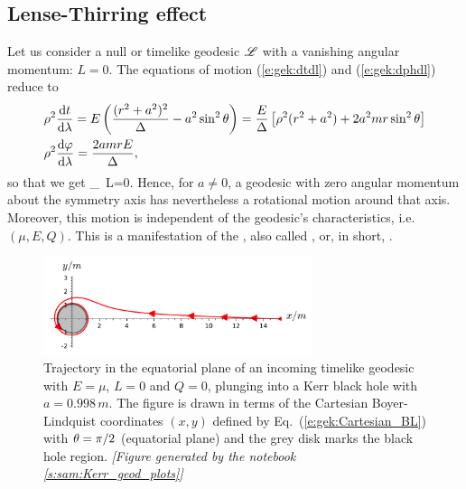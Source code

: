 \subsection{Lense-Thirring effect} \label{s:gek:Lense-Thirring}

Let us consider a null or timelike geodesic $\mathscr{L}$ with a vanishing angular
momentum: $L=0$. The equations of motion (\ref{e:gek:dtdl}) and (\ref{e:gek:dphdl})
reduce to
\begin{align}
& \rho^2 \frac{\mathrm{d} t}{\mathrm{d} \lambda} = E \left( \frac{(r^2 + a^2)^2}{\Delta}   - a^2 \sin^2\theta \right)
= \frac{E}{\Delta} \left[ \rho^2(r^2 + a^2) + 2 a^2 m r \sin^2\theta \right] \nonumber \\
& \rho^2 \frac{\mathrm{d} \varphi}{\mathrm{d} \lambda}  = \frac{2 a m r E}{\Delta} , \nonumber
\end{align}
so that we get
\be \label{e:gek:dphdt_frame_dragging}
     _{\ L=0}.
\ee
Hence, for $a\neq 0$, a geodesic with zero angular momentum about the
symmetry axis has nevertheless a rotational motion around that axis.
Moreover, this motion is independent of the geodesic's characteristics, i.e. $(\mu,E,Q)$.
This is a manifestation of the ,
also called , or, in short, .

\begin{figure}
\centerline{\includegraphics[width=0.7\textwidth]{gek_frame_dragging.pdf}}
\caption[]{\label{f:gek:frame_dragging} \footnotesize
Trajectory in the equatorial plane of an incoming timelike geodesic with
$E = \mu$, $L=0$ and $Q=0$, plunging into a Kerr black hole with $a = 0.998 \, m$.
The figure is drawn in terms
of the Cartesian Boyer-Lindquist coordinates $(x,y)$ defined by
Eq.~(\ref{e:gek:Cartesian_BL}) with $\theta=\pi/2$ (equatorial plane)
and the grey disk marks the black hole region.
\textsl{[Figure generated by the notebook \ref{s:sam:Kerr_geod_plots}]}
}
\end{figure}

